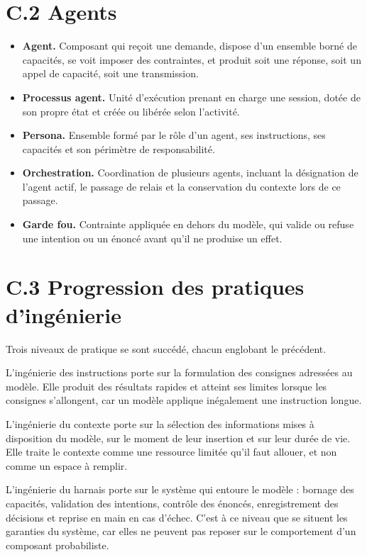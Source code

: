 \section*{C.2 Agents}

\begin{itemize}
  \item \textbf{Agent.} Composant qui reçoit une demande, dispose d'un ensemble borné de capacités, se voit imposer des contraintes, et produit soit une réponse, soit un appel de capacité, soit une transmission.
  \item \textbf{Processus agent.} Unité d'exécution prenant en charge une session, dotée de son propre état et créée ou libérée selon l'activité.
  \item \textbf{Persona.} Ensemble formé par le rôle d'un agent, ses instructions, ses capacités et son périmètre de responsabilité.
  \item \textbf{Orchestration.} Coordination de plusieurs agents, incluant la désignation de l'agent actif, le passage de relais et la conservation du contexte lors de ce passage.
  \item \textbf{Garde fou.} Contrainte appliquée en dehors du modèle, qui valide ou refuse une intention ou un énoncé avant qu'il ne produise un effet.
\end{itemize}

\section*{C.3 Progression des pratiques d'ingénierie}

Trois niveaux de pratique se sont succédé, chacun englobant le précédent.

L'ingénierie des instructions porte sur la formulation des consignes adressées au modèle. Elle produit des résultats rapides et atteint ses limites lorsque les consignes s'allongent, car un modèle applique inégalement une instruction longue.

L'ingénierie du contexte porte sur la sélection des informations mises à disposition du modèle, sur le moment de leur insertion et sur leur durée de vie. Elle traite le contexte comme une ressource limitée qu'il faut allouer, et non comme un espace à remplir.

L'ingénierie du harnais porte sur le système qui entoure le modèle : bornage des capacités, validation des intentions, contrôle des énoncés, enregistrement des décisions et reprise en main en cas d'échec. C'est à ce niveau que se situent les garanties du système, car elles ne peuvent pas reposer sur le comportement d'un composant probabiliste.

